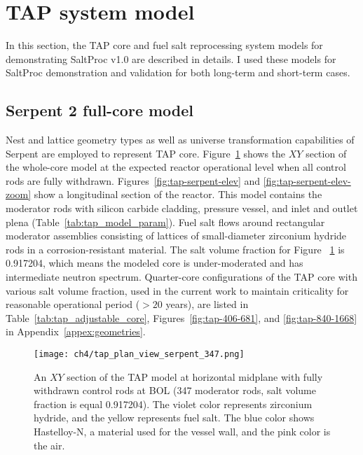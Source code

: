 \section{TAP system model}
In this section, the \gls{TAP} core and fuel salt reprocessing system models  
for demonstrating SaltProc v1.0 are described in details. I used these models 
for SaltProc demonstration and validation for both long-term and short-term 
cases.

\subsection{Serpent 2 full-core model} \label{sec:tap_model}
Nest and lattice geometry types as well as universe transformation 
capabilities of Serpent \cite{leppanen_serpent_2014} are employed to 
represent \gls{TAP} core. Figure~\ref{fig:tap-serpent-plan} shows the $XY$ 
section of the whole-core model at the expected reactor operational level 
when all control rods are fully withdrawn. Figures~\ref{fig:tap-serpent-elev} 
and \ref{fig:tap-serpent-elev-zoom} show a longitudinal section of the 
reactor. This model contains the moderator rods with silicon carbide cladding, 
pressure vessel, and inlet and outlet plena (Table~\ref{tab:tap_model_param}). 
Fuel salt flows around rectangular moderator assemblies consisting of lattices 
of small-diameter zirconium hydride rods in a corrosion-resistant material. 
The salt volume fraction for Figure ~\ref{fig:tap-serpent-plan} is 0.917204, 
which means the modeled core is under-moderated and has intermediate neutron 
spectrum. Quarter-core configurations of the \gls{TAP} core with various salt 
volume fraction, used in the current work to maintain criticality for 
reasonable operational period ($>20$ years), are listed in 
Table~\ref{tab:tap_adjustable_core}, Figures~\ref{fig:tap-406-681}, and 
\ref{fig:tap-840-1668} in Appendix~\ref{appex:geometries}.
\begin{figure}[htp!] %
	\centering
	\texttt{[image: ch4/tap\_plan\_view\_serpent\_347.png]}
	\caption{An $XY$ section of the \gls{TAP} model at horizontal midplane 
		with fully withdrawn control rods at \gls{BOL} (347 moderator rods, 
		salt volume fraction is equal 0.917204). 
		The violet color represents zirconium hydride, and the yellow 
		represents fuel salt. 
		The blue color shows Hastelloy-N, a material used for the vessel wall, 
		and the pink color is the air.}
	\label{fig:tap-serpent-plan}
\end{figure}

